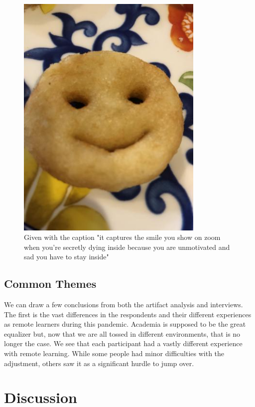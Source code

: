 \documentclass[12pt,
 reprint,
nofootinbib,
 amsmath,amssymb,
 aps,
floatfix,
]{revtex4-2}
\begin{document}
\begin{figure}[h!]
    \centering
    \includegraphics[width=9cm]{fry.jpg}
    \caption{Given with the caption "it captures the smile you show on zoom when you’re secretly dying inside because you are unmotivated and sad you have to stay inside"}
    \label{fig:fry}
\end{figure}


\subsection{Common Themes}

We can draw a few conclusions from both the artifact analysis and interviews. The first is the vast differences in the respondents and their different experiences as remote learners during this pandemic. Academia is supposed to be the great equalizer but, now that we are all tossed in different environments, that is no longer the case. We see that each participant had a vastly different experience with remote learning. While some people had minor difficulties with the adjustment, others saw it as a significant hurdle to jump over.


\section{Discussion}
\end{document}
